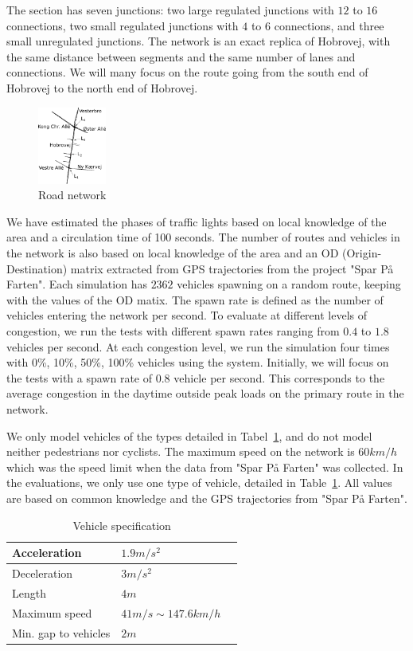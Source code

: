 The section has seven junctions: two large regulated junctions with $12$ to $16$ connections, two small regulated junctions with $4$ to $6$ connections, and three small unregulated junctions.
The network is an exact replica of Hobrovej, with the same distance between segments and the same number of lanes and connections.
We will many focus on the route going from the south end of Hobrovej to the north end of Hobrovej.
\begin{figure}[htb]
\centering
\includegraphics[width=0.2\textwidth]{../images/HobrovejNy.png}
\caption{Road network}
\label{fig:Introduction:hobro}
\end{figure}

We have estimated the phases of traffic lights based on local knowledge of the area and a circulation time of 100 seconds.
The number of routes and vehicles in the network is also based on local knowledge of the area and an OD (Origin-Destination) matrix extracted from GPS trajectories from the project "Spar På Farten"\cite{SparPaFarten}.
Each simulation has $2362$ vehicles spawning on a random route, keeping with the values of the OD matix.
The spawn rate is defined as the number of vehicles entering the network per second.
To evaluate \tech at different levels of congestion, we run the tests with different spawn rates ranging from $0.4$ to $1.8$ vehicles per second.
At each congestion level, we run the simulation four times with 0\%, 10\%, 50\%, 100\% vehicles using the system.
Initially, we will focus on the tests with a spawn rate of $0.8$ vehicle per second. %
This corresponds to the average congestion in the daytime outside peak loads on the primary route in the network.

We only model vehicles of the types detailed in Tabel~\ref{table.vehicleTypes}, and do not model neither pedestrians nor cyclists.
The maximum speed on the network is $60km/h$ which was the speed limit when the data from "Spar På Farten" was collected.
In the evaluations, we only use one type of vehicle, detailed in Table~\ref{table.vehicleTypes}. 
All values are based on common knowledge and the GPS trajectories from "Spar På Farten".

\begin{table}
\centering
\begin{tabular}{|l|l|l|}\hline
Acceleration			& $1.9 m/s^2$	\\\hline
Deceleration			& $3 m/s^2$ 	\\\hline
Length					& $4 m$ 		\\\hline
Maximum speed			& $41 m/s \sim 147.6 km/h$ \\\hline
Min. gap to vehicles	& $2 m$ 		\\\hline
\end{tabular}
\caption{Vehicle specification}\label{table.vehicleTypes}
\end{table}


